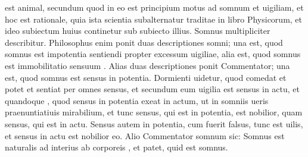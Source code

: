 \documentclass{article}
\begin{document}
\meaning\textdir
\beginnumbering
\pstart
{}    est animal, secundum quod in
eo est principium motus ad somnum et uigiliam, et hoc est rationale,
quia ista scientia subalternatur
 traditae in libro
Physicorum, et ideo subiectum huius continetur sub subiecto illius.
Somnus multipliciter describitur. Philosophus enim ponit duas
descriptiones somni; una est, quod somnus est impotentia sentiendi
propter excessum uigiliae, alia est, quod somnus est immobilitatio
sensuum . Alias duas descriptiones ponit Commentator;
una est, quod somnus est sensus in potentia. Dormienti
 uidetur, quod comedat et potet
et sentiat per omnes  sensus, et secundum eum uigilia est sensus in
actu, et quandoque ,
quod sensus in potentia exeat in actum, ut in somniis ueris
praenuntiatiuis mirabilium, et tunc sensus, qui est in potentia, est
nobilior, quam sensus, qui est in actu. Sensus autem in potentia, cum
fuerit falsus, tunc est uilis, et sensus in actu est nobilior eo. Alio
 Commentator somnum
sic: Somnus est 
 naturalis ad interius
ab  corporeis
,
et  patet, quid est somnus.
\pend
\endnumbering
\end{document}
